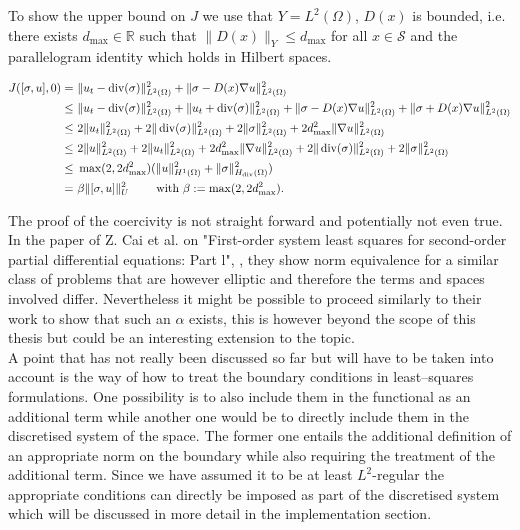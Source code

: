 \documentclass[../draft_1.tex]{subfiles}
\begin{document}
To show the upper bound on $J$ we use that $Y = L^2(\Omega)$, $D(x)$ is bounded, i.e. there exists $d_{\text{max}} \in \mathbb{R}$ such that $\| D(x) \|_Y \leq d_{\text{max}}$ for all $x \in \mathcal{S}$ and the parallelogram identity which holds in Hilbert spaces. 
\begin{ceqn}
	\begin{equation}
	\begin{aligned}
	J([\sigma, u], 0) = \  & \| u_t - \mathop{}\!\mathrm{div}(\sigma) \|_{L^2(\Omega)}^2 + \| \sigma - D(x) \nabla u \|_{L^2(\Omega)}^2 \\  
	\leq \ & \| u_t - \mathop{}\!\mathrm{div}(\sigma) \|_{L^2(\Omega)}^2 + \| u_t + \mathop{}\!\mathrm{div}(\sigma) \|_{L^2(\Omega)}^2 + \| \sigma - D(x) \nabla u \|_{L^2(\Omega)}^2 +  \| \sigma + D(x) \nabla u \|_{L^2(\Omega)}^2 \\
	\leq \ & 2 \| u_t \|_{L^2(\Omega)}^2 + 2 \| \mathop{}\!\mathrm{div}(\sigma) \|_{L^2(\Omega)}^2 + 2 \| \sigma \|_{L^2(\Omega)}^2+ 2 d_{\max}^2 \| \nabla u \|_{L^2(\Omega)}^2  \\
	\leq \ & 2 \| u \|_{L^2(\Omega)}^2 + 2 \| u_t \|_{L^2(\Omega)}^2 + 2 d_{\max}^2 \| \nabla u \|_{L^2(\Omega)}^2 + 2 \| \mathop{}\!\mathrm{div}(\sigma) \|_{L^2(\Omega)}^2 + 2 \| \sigma \|_{L^2(\Omega)}^2 \\
	\leq \ & \max(2, 2 d_{\max}^2) (\| u \|_{H^1(\Omega)}^2 + \| \sigma \|_{H_{\mathop{}\!\mathrm{div}}(\Omega)}^2)	\\
	=  \ & \beta \| [\sigma, u] \|_U^2 \qquad \text{ with } \beta:= \max(2, 2 d_{\max}^2).
	\end{aligned}
	\end{equation}
\end{ceqn}
The proof of the coercivity is not straight forward and potentially not even true. In the paper of Z. Cai et al. on "First-order system least squares for second-order partial differential equations: Part l", \cite{cai1994first}, they show norm equivalence for a similar class of problems that are however elliptic and therefore the terms and spaces involved differ. Nevertheless it might be possible to proceed similarly to their work to show that such an $\alpha$ exists, this is however beyond the scope of this thesis but could be an interesting extension to the topic.
\smallskip
\\
A point that has not really been discussed so far but will have to be taken into account is the way of how to treat the boundary conditions in least--squares formulations. One possibility is to also include them in the functional as an additional term while another one would be to directly include them in the discretised system of the space. The former one entails the additional definition of an appropriate norm on the boundary while also requiring the treatment of the additional term. Since we have assumed it to be at least $L^2$-regular the appropriate conditions can directly be imposed as part of the discretised system which will be discussed in more detail in the implementation section.
\end{document}
